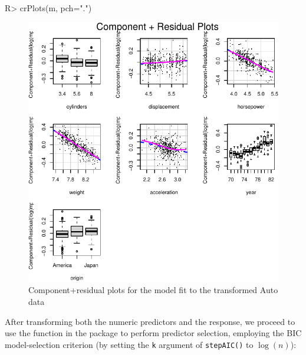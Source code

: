 \documentclass[
]{jss}
\begin{document}
\begin{CodeChunk}
\begin{CodeInput}
R> crPlots(m, pch=".")
\end{CodeInput}
\begin{figure}

{\centering \includegraphics[width=0.6\linewidth]{JSS-article-reduced-2_files/figure-latex/Auto-CR-plots-transformed-1} 

}

\caption[Component+residual plots for the model fit to the transformed Auto data]{Component+residual plots for the model fit to the transformed Auto data}\label{fig:Auto-CR-plots-transformed}
\end{figure}
\end{CodeChunk}

After transforming both the numeric predictors and the response, we
proceed to use the  function in the  package
to perform predictor selection, employing the BIC model-selection
criterion (by setting the \texttt{k} argument of \texttt{stepAIC()} to
\(\log(n)\)):
\end{document}
